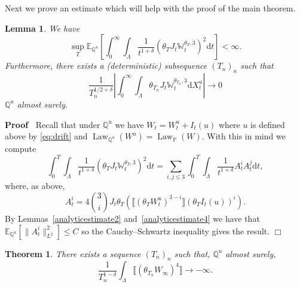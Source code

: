 \documentclass[11pt]{article}
\newcommand{\mathd}{\mathrm{d}}
\newcommand{\tmop}[1]{\ensuremath{\operatorname{#1}}}
\newenvironment{proof}{\noindent\textbf{Proof\ }}{\hspace*{\fill}$\Box$\medskip}
\newtheorem{lemma}{Lemma}
\newtheorem{theorem}{Theorem}
\begin{document}
Next we prove an estimate which will help with the proof of the main theorem.

\begin{lemma}
  \label{Qcubeestimate}We have
  \[ \sup_T \mathbb{E}_{\mathbb{Q}^u} \left[ \int^{\infty}_0 \int_{\Lambda}
     \frac{1}{t^{1 + \delta}} (\theta_T J_t \mathbb{W}_t^{\theta_T, 3})^2
     \mathd t \right] < \infty . \]
  Furthermore, there exists a (deterministic) subsequence $(T_n)_n$ such that
  \
  \[ \frac{1}{T_n^{1 / 2 + \delta}} \left| \int^{\infty}_0 \int_{\Lambda}
     \theta_{T_n} J_t \mathbb{W}_t^{\theta_{T_n}, 3} \mathd X^u_t \right|
     \rightarrow 0 \]
  $\mathbb{Q}^u$ almost surely.
\end{lemma}

\begin{proof}
  Recall that under $\mathbb{Q}^u$ we have $W_t = W_t^u + I_t (u)$ where $u$
  is defined above by {\eqref{eq:drift}} and $\tmop{Law}_{\mathbb{Q}^u} (W^u)
  = \tmop{Law}_{\mathbb{P}} (W)$. With this in mind we compute
  \[ \int^T_0 \int_{\Lambda} \frac{1}{t^{1 + \delta}} (\theta_T J_t
     \mathbb{W}_t^{\theta_T, 3})^2 \mathd t = \sum_{i, j \leqslant 3} \int^T_0
     \int_{\Lambda} \frac{1}{t^{1 + \delta}} A_t^i A_t^j \mathd t, \]
  where, as above,
  \[ A_t^i = 4 \binom{3}{i} J_t \theta_T (\llbracket (\theta_T W^u_t)^{3 - i}
     \rrbracket (\theta_T I_t (u))^i) . \]
  By Lemmas~\ref{analyticestimate2} and~\ref{analyticestimate4} we have that
  $\mathbb{E}_{\mathbb{Q}^u} [\| A_t^i \|^2_{L^2}] \leqslant C$ so the
  Cauchy--Schwartz inequality gives the result.
\end{proof}

\begin{theorem}
  There exists a sequence $(T_n)_n$ such that, $\mathbb{Q}^u$ almost surely,
  \[ \frac{1}{T^{1 - \delta}_n} \int_{\Lambda} \llbracket (\theta_{T_n}
     W_{\infty})^4 \rrbracket \rightarrow - \infty . \]
\end{theorem}
\end{document}
